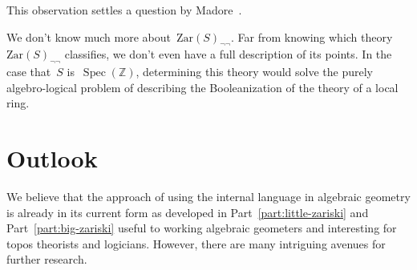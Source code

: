 \documentclass[10pt,reqno,a4paper]{amsbook}
\theoremstyle{definition}
\theoremstyle{plain}
\theoremstyle{remark}
\newcommand{\ZZ}{\mathbb{Z}}
\newcommand{\Zar}{\mathrm{Zar}}
\DeclareMathOperator{\Spec}{Spec}
\newcommand{\?}{\,{:}\,}
\renewcommand{\_}{\mathpunct{.}\,}
\begin{document}
This observation settles a question by
Madore~\cite[entry~2002-03-16:036]{madore:diary}.

We don't know much more about~$\Zar(S)_{\neg\neg}$. Far from knowing which
theory~$\Zar(S)_{\neg\neg}$ classifies, we don't even have a full description
of its points. In the case that~$S$ is~$\Spec(\ZZ)$, determining this theory
would solve the purely algebro-logical problem of describing the
Booleanization of the theory of a local ring.


\section{Outlook}
\label{sect:outlook}

We believe that the approach of using the internal language in algebraic geometry
is already in its current form as developed in Part~\ref{part:little-zariski} and
Part~\ref{part:big-zariski} useful to working algebraic geometers
and interesting for topos theorists and logicians. However, there are many
intriguing avenues for further research.
\end{document}
